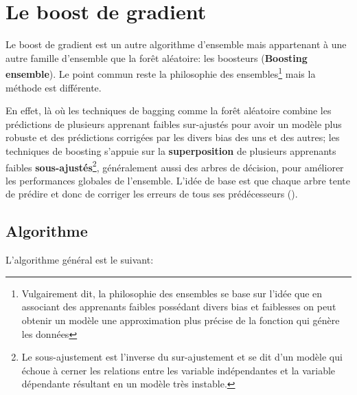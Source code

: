 \section{Le boost de gradient}
\label{chap4.section4}
Le boost de gradient est un autre algorithme d'ensemble mais appartenant à une autre famille d'ensemble que la forêt aléatoire: les boosteurs (\textbf{Boosting ensemble}). Le point commun reste la philosophie des ensembles\footnote{Vulgairement dit, la philosophie des ensembles se base sur l'idée que en associant des apprenants faibles possédant divers bias et faiblesses on peut obtenir un modèle une approximation plus précise de la fonction qui génère les données} mais la méthode est différente.

En effet, là où les techniques de bagging comme la forêt aléatoire combine les prédictions de plusieurs apprenant faibles sur-ajustés pour avoir un modèle plus robuste et des prédictions corrigées par les divers bias des uns et des autres; les techniques de boosting s'appuie sur la \textbf{superposition} de plusieurs apprenants faibles \textbf{sous-ajustés}\footnote{Le sous-ajustement est l'inverse du sur-ajustement et se dit d'un modèle qui échoue à cerner les relations entre les variable indépendantes et la variable dépendante résultant en un modèle très instable.}, généralement aussi des arbres de décision, pour améliorer les performances globales de l'ensemble. L’idée de base est que chaque arbre tente de prédire et donc de corriger les erreurs de tous ses prédécesseurs (\cite{friedman2001greedy}). 

\subsection{Algorithme}
\label{chap4.sec4.sub1}
L’algorithme général est le suivant:

